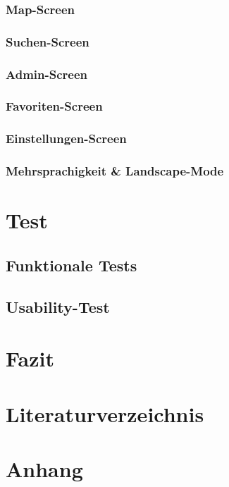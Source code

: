 \documentclass[12pt, a4paper, oneside]{article}
\begin{document}
\subsubsection{Map-Screen}
\subsubsection{Suchen-Screen}
\subsubsection{Admin-Screen}
\subsubsection{Favoriten-Screen}
\subsubsection{Einstellungen-Screen}
\subsubsection{Mehrsprachigkeit \& Landscape-Mode}

\section{Test}
\subsection{Funktionale Tests}
\subsection{Usability-Test}
\newpage

\section{Fazit}

\section{Literaturverzeichnis}

\renewcommand{\refname}{} 


\newpage


\appendix %
\section{Anhang}
\end{document}
